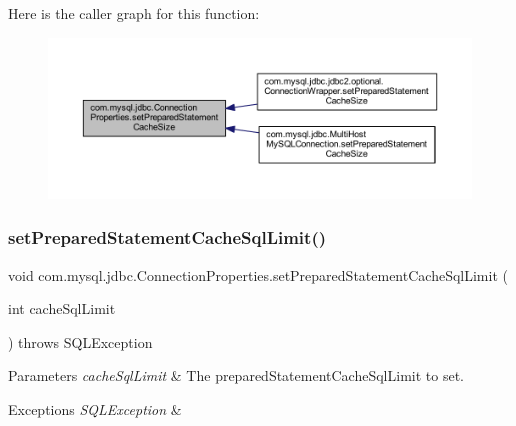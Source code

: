 Here is the caller graph for this function\+:\nopagebreak
\begin{figure}[H]
\begin{center}
\leavevmode
\includegraphics[width=350pt]{interfacecom_1_1mysql_1_1jdbc_1_1_connection_properties_ad65dad2e98f66f1b4a8d1aff24cbc2d5_icgraph}
\end{center}
\end{figure}
\mbox{\label{interfacecom_1_1mysql_1_1jdbc_1_1_connection_properties_a7cf7fc262516d73e70ac5dbba0d6a510}} 
\subsubsection{\texorpdfstring{set\+Prepared\+Statement\+Cache\+Sql\+Limit()}{setPreparedStatementCacheSqlLimit()}}
{\footnotesize\ttfamily void com.\+mysql.\+jdbc.\+Connection\+Properties.\+set\+Prepared\+Statement\+Cache\+Sql\+Limit (\begin{DoxyParamCaption}\item[{int}]{cache\+Sql\+Limit }\end{DoxyParamCaption}) throws S\+Q\+L\+Exception}


\begin{DoxyParams}{Parameters}
{\em cache\+Sql\+Limit} & The prepared\+Statement\+Cache\+Sql\+Limit to set. \\
\hline
\end{DoxyParams}

\begin{DoxyExceptions}{Exceptions}
{\em S\+Q\+L\+Exception} & \\
\hline
\end{DoxyExceptions}


